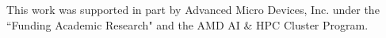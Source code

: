 \begin{acks}
This work was supported in part by Advanced Micro Devices, Inc. under the ``Funding Academic Research" and the AMD AI \& HPC Cluster Program.
\end{acks}